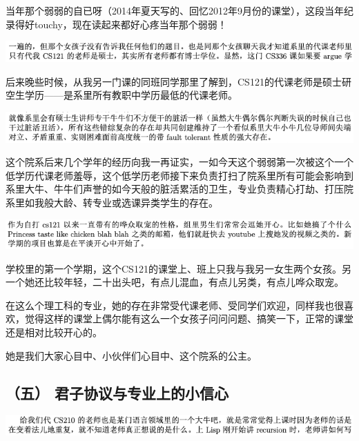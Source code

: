 \documentclass[9pt, b5paper]{article}
\begin{document}
当年那个弱弱的自已呀（2014年夏天写的、回忆2012年9月份的课堂），这段当年纪录得好touchy，现在读起来都好心疼当年那个弱弱！

\begin{center}
\includegraphics[width=.9\linewidth]{./pic/backups_plans_20210424_210229.png}
\end{center}

后来晚些时候，从我另一门课的同班同学那里了解到，CS121的代课老师是硕士研空生学历——是系里所有教职中学历最低的代课老师。

\begin{center}
\includegraphics[width=.9\linewidth]{./pic/backups_plans_20210424_155915.png}
\end{center}

这个院系后来几个学年的经历向我一再证实，一如今天这个弱弱第一次被这个一个低学历代课老师羞辱，这个低学历老师接下来负责打扫了院系里所有可能会影响到系里大牛、牛牛们声誉的如今天般的脏活累活的卫生，专业负责精心打劫、打压院系里如我般大龄、转专业或选课异类学生的存在。


\begin{center}
\includegraphics[width=.9\linewidth]{./pic/backups_plans_20210424_160112.png}
\end{center}

学校里的第一个学期，这个CS121的课堂上、班上只我与我另一女生两个女孩。另一个她还比较年轻，二十出头吧，有点儿混血，有点儿另类，有点儿哗众取宠。

在这么个理工科的专业，她的存在非常受代课老师、受同学们欢迎，同样我也很喜欢，觉得这样的课堂上偶尔能有这么一个女孩子问问问题、搞笑一下，正常的课堂还是相对比较开心的。 

她是我们大家心目中、小伙伴们心目中、这个院系的公主。 

\subsection{（五） 君子协议与专业上的小信心}
\label{sec:orgb2dd070}

\begin{center}
\includegraphics[width=.9\linewidth]{./pic/backups_plans_20210424_203858.png}
\end{center}
\end{document}
